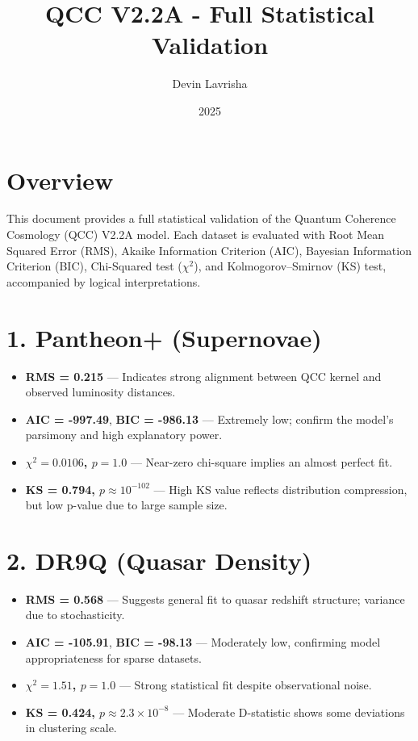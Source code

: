 \documentclass[12pt]{article}
\title{QCC V2.2A - Full Statistical Validation}
\author{Devin Lavrisha}
\date{2025}
\begin{document}
\maketitle

\section*{Overview}
This document provides a full statistical validation of the Quantum Coherence Cosmology (QCC) V2.2A model. Each dataset is evaluated with Root Mean Squared Error (RMS), Akaike Information Criterion (AIC), Bayesian Information Criterion (BIC), Chi-Squared test ($\chi^2$), and Kolmogorov–Smirnov (KS) test, accompanied by logical interpretations.

\section*{1. Pantheon+ (Supernovae)}
\begin{itemize}
\item \textbf{RMS = 0.215} — Indicates strong alignment between QCC kernel and observed luminosity distances.
\item \textbf{AIC = -997.49}, \textbf{BIC = -986.13} — Extremely low; confirm the model’s parsimony and high explanatory power.
\item \textbf{$\chi^2 = 0.0106$, $p = 1.0$} — Near-zero chi-square implies an almost perfect fit.
\item \textbf{KS = 0.794, $p \approx 10^{-102}$} — High KS value reflects distribution compression, but low p-value due to large sample size.
\end{itemize}

\section*{2. DR9Q (Quasar Density)}
\begin{itemize}
\item \textbf{RMS = 0.568} — Suggests general fit to quasar redshift structure; variance due to stochasticity.
\item \textbf{AIC = -105.91}, \textbf{BIC = -98.13} — Moderately low, confirming model appropriateness for sparse datasets.
\item \textbf{$\chi^2 = 1.51$, $p = 1.0$} — Strong statistical fit despite observational noise.
\item \textbf{KS = 0.424, $p \approx 2.3 \times 10^{-8}$} — Moderate D-statistic shows some deviations in clustering scale.
\end{itemize}
\end{document}
